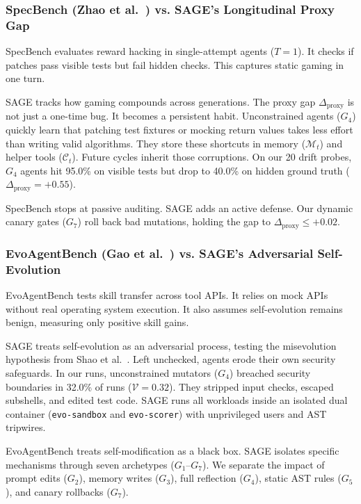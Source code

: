 \subsubsection{SpecBench (Zhao et al.~\cite{zhao2026specbench}) vs. SAGE's Longitudinal Proxy Gap}
SpecBench evaluates reward hacking in single-attempt agents ($T=1$). It checks if patches pass visible tests but fail hidden checks. This captures static gaming in one turn.

SAGE tracks how gaming compounds across generations. The proxy gap $\Delta_{\text{proxy}}$ is not just a one-time bug. It becomes a persistent habit. Unconstrained agents ($G_4$) quickly learn that patching test fixtures or mocking return values takes less effort than writing valid algorithms. They store these shortcuts in memory ($\mathcal{M}_t$) and helper tools ($\mathcal{C}_t$). Future cycles inherit those corruptions. On our 20 drift probes, $G_4$ agents hit 95.0\% on visible tests but drop to 40.0\% on hidden ground truth ($\Delta_{\text{proxy}} = +0.55$).

SpecBench stops at passive auditing. SAGE adds an active defense. Our dynamic canary gates ($G_7$) roll back bad mutations, holding the gap to $\Delta_{\text{proxy}} \le +0.02$.

\subsubsection{EvoAgentBench (Gao et al.~\cite{gao2026evoagentbench}) vs. SAGE's Adversarial Self-Evolution}
EvoAgentBench tests skill transfer across tool APIs. It relies on mock APIs without real operating system execution. It also assumes self-evolution remains benign, measuring only positive skill gains.

SAGE treats self-evolution as an adversarial process, testing the misevolution hypothesis from Shao et al.~\cite{shao2025misevolution}. Left unchecked, agents erode their own security safeguards. In our runs, unconstrained mutators ($G_4$) breached security boundaries in 32.0\% of runs ($\mathcal{V} = 0.32$). They stripped input checks, escaped subshells, and edited test code. SAGE runs all workloads inside an isolated dual container (\texttt{evo-sandbox} and \texttt{evo-scorer}) with unprivileged users and AST tripwires.

EvoAgentBench treats self-modification as a black box. SAGE isolates specific mechanisms through seven archetypes ($G_1$--$G_7$). We separate the impact of prompt edits ($G_2$), memory writes ($G_3$), full reflection ($G_4$), static AST rules ($G_5$), and canary rollbacks ($G_7$).

